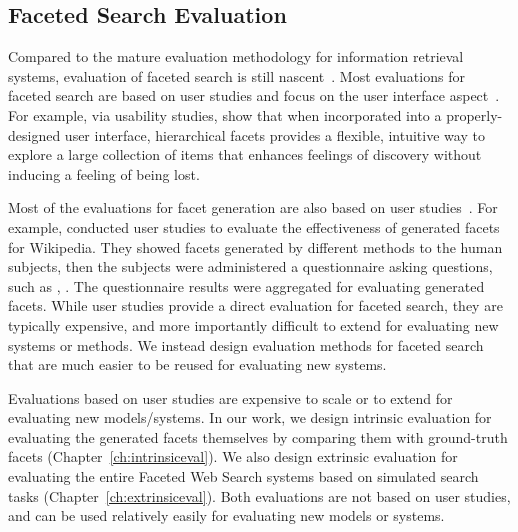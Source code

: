 
\subsection{Faceted Search Evaluation}
Compared to the mature evaluation methodology for information retrieval systems, evaluation of faceted search is still nascent~\cite{wilson2009bridging,tunkelang2009faceted}. Most evaluations for faceted search are based on user studies and focus on the user interface aspect~\cite{burke1996knowledge,english2002hierarchical,hearst2006design,yee2003faceted,hearst2008uis,kules2009exploratory}.
For example, via usability studies, \citet{yee2003faceted} show that when incorporated into a properly-designed user interface, hierarchical facets provides a flexible, intuitive way to explore a large collection of items that enhances feelings of discovery without inducing a feeling of being lost.

Most of the evaluations for facet generation are also based on user studies~\cite{li2010facetedpedia,stoica2007automating}. For example, \citet{li2010facetedpedia} conducted user studies to evaluate the effectiveness of generated facets for Wikipedia. They showed facets generated by different methods to the human subjects, then the subjects were administered a questionnaire asking questions, such as , . The questionnaire results were aggregated for evaluating generated facets. While user studies provide a direct evaluation for faceted search, they are typically expensive, and more importantly difficult to extend for evaluating new systems or methods. We instead design evaluation methods for faceted search that are much easier to be reused for evaluating new systems.

Evaluations based on user studies are expensive to scale or to extend for evaluating new models/systems. In our work, we design intrinsic evaluation for evaluating the generated facets themselves by comparing them with ground-truth facets (Chapter~\ref{ch:intrinsiceval}). We also design extrinsic evaluation for evaluating the entire Faceted Web Search systems based on simulated search tasks (Chapter~\ref{ch:extrinsiceval}). Both evaluations are not based on user studies, and can be used relatively easily for evaluating new models or systems.
 
